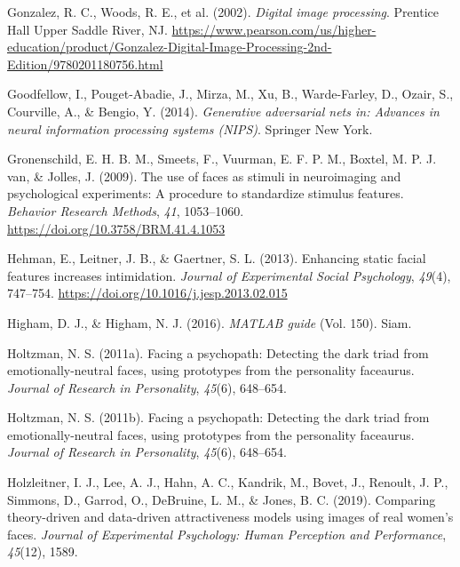 \documentclass[
  man,floatsintext]{apa6}
\newlength{\cslhangindent}
\newlength{\cslentryspacingunit} %
\newenvironment{CSLReferences}[2] %
 {%
  \setlength{\parindent}{0pt}
  \ifodd #1
  \let\oldpar\par
  \def\par{\hangindent=\cslhangindent\oldpar}
  \fi
  \setlength{\parskip}{#2\cslentryspacingunit}
 }%
 {}
\begin{document}
\begin{CSLReferences}{1}{0}
\leavevmode{}%
Gonzalez, R. C., Woods, R. E., et al. (2002). \emph{Digital image processing}. Prentice Hall Upper Saddle River, NJ. \url{https://www.pearson.com/us/higher-education/product/Gonzalez-Digital-Image-Processing-2nd-Edition/9780201180756.html}

\leavevmode{}%
Goodfellow, I., Pouget-Abadie, J., Mirza, M., Xu, B., Warde-Farley, D., Ozair, S., Courville, A., \& Bengio, Y. (2014). \emph{Generative adversarial nets in: Advances in neural information processing systems (NIPS)}. Springer New York.

\leavevmode{}%
Gronenschild, E. H. B. M., Smeets, F., Vuurman, E. F. P. M., Boxtel, M. P. J. van, \& Jolles, J. (2009). The use of faces as stimuli in neuroimaging and psychological experiments: A procedure to standardize stimulus features. \emph{Behavior Research Methods}, \emph{41}, 1053--1060. \url{https://doi.org/10.3758/BRM.41.4.1053}

\leavevmode{}%
Hehman, E., Leitner, J. B., \& Gaertner, S. L. (2013). Enhancing static facial features increases intimidation. \emph{Journal of Experimental Social Psychology}, \emph{49}(4), 747--754. \url{https://doi.org/10.1016/j.jesp.2013.02.015}

\leavevmode{}%
Higham, D. J., \& Higham, N. J. (2016). \emph{MATLAB guide} (Vol. 150). Siam.

\leavevmode{}%
Holtzman, N. S. (2011a). Facing a psychopath: Detecting the dark triad from emotionally-neutral faces, using prototypes from the personality faceaurus. \emph{Journal of Research in Personality}, \emph{45}(6), 648--654.

\leavevmode{}%
Holtzman, N. S. (2011b). Facing a psychopath: Detecting the dark triad from emotionally-neutral faces, using prototypes from the personality faceaurus. \emph{Journal of Research in Personality}, \emph{45}(6), 648--654.

\leavevmode{}%
Holzleitner, I. J., Lee, A. J., Hahn, A. C., Kandrik, M., Bovet, J., Renoult, J. P., Simmons, D., Garrod, O., DeBruine, L. M., \& Jones, B. C. (2019). Comparing theory-driven and data-driven attractiveness models using images of real women's faces. \emph{Journal of Experimental Psychology: Human Perception and Performance}, \emph{45}(12), 1589.


\end{CSLReferences}
\end{document}
